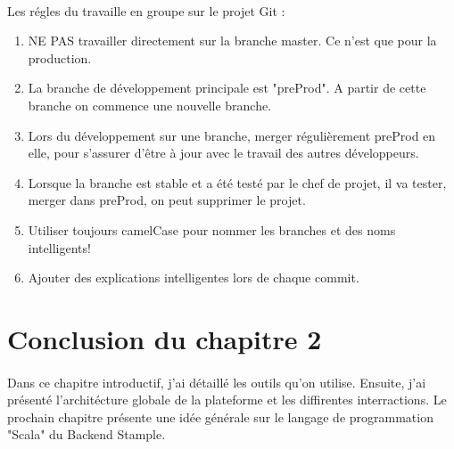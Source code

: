 \paragraph{}
Les régles du travaille en groupe sur le projet Git :
\begin{enumerate}
\item NE PAS travailler directement sur la branche master. Ce n'est que pour la production.
\item La branche de développement principale est "preProd". A partir de cette branche on commence une nouvelle branche. 
\item Lors du développement sur une branche, merger régulièrement preProd en elle, pour s'assurer d'être à jour avec le travail des autres développeurs.
\item Lorsque la branche est stable et a été testé par le chef de projet, il va tester, merger dans preProd, on peut supprimer le projet.
\item Utiliser toujours camelCase pour nommer les branches et des noms intelligents!
\item Ajouter des explications intelligentes lors de chaque commit.
\end{enumerate}
\section{Conclusion du chapitre 2}
\paragraph{}
Dans ce chapitre introductif, j'ai détaillé les outils qu'on utilise. Ensuite, j'ai présenté l'architécture globale de la plateforme et les diffirentes interractions. Le prochain chapitre présente une idée générale sur le langage de programmation "Scala" du Backend Stample. 

